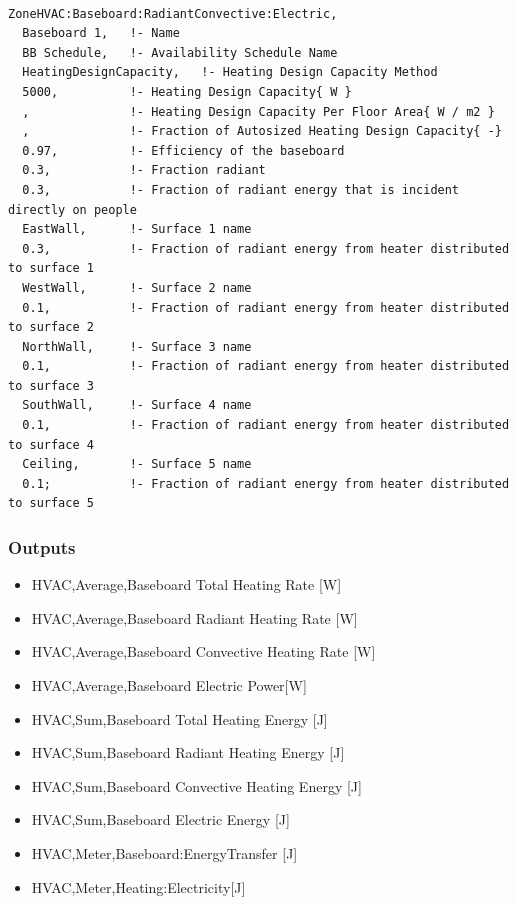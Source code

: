\begin{lstlisting}

ZoneHVAC:Baseboard:RadiantConvective:Electric,
  Baseboard 1,   !- Name
  BB Schedule,   !- Availability Schedule Name
  HeatingDesignCapacity,   !- Heating Design Capacity Method
  5000,          !- Heating Design Capacity{ W }
  ,              !- Heating Design Capacity Per Floor Area{ W / m2 }
  ,              !- Fraction of Autosized Heating Design Capacity{ -}
  0.97,          !- Efficiency of the baseboard
  0.3,           !- Fraction radiant
  0.3,           !- Fraction of radiant energy that is incident directly on people
  EastWall,      !- Surface 1 name
  0.3,           !- Fraction of radiant energy from heater distributed to surface 1
  WestWall,      !- Surface 2 name
  0.1,           !- Fraction of radiant energy from heater distributed to surface 2
  NorthWall,     !- Surface 3 name
  0.1,           !- Fraction of radiant energy from heater distributed to surface 3
  SouthWall,     !- Surface 4 name
  0.1,           !- Fraction of radiant energy from heater distributed to surface 4
  Ceiling,       !- Surface 5 name
  0.1;           !- Fraction of radiant energy from heater distributed to surface 5
\end{lstlisting}

\subsubsection{Outputs}\label{outputs-2-017}

\begin{itemize}
\item
  HVAC,Average,Baseboard Total Heating Rate {[}W{]}
\item
  HVAC,Average,Baseboard Radiant Heating Rate {[}W{]}
\item
  HVAC,Average,Baseboard Convective Heating Rate {[}W{]}
\item
  HVAC,Average,Baseboard Electric Power{[}W{]}
\item
  HVAC,Sum,Baseboard Total Heating Energy {[}J{]}
\item
  HVAC,Sum,Baseboard Radiant Heating Energy {[}J{]}
\item
  HVAC,Sum,Baseboard Convective Heating Energy {[}J{]}
\item
  HVAC,Sum,Baseboard Electric Energy {[}J{]}
\item
  HVAC,Meter,Baseboard:EnergyTransfer {[}J{]}
\item
  HVAC,Meter,Heating:Electricity{[}J{]}
\end{itemize}


